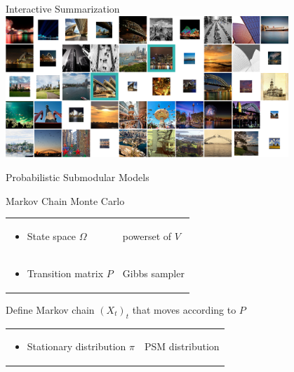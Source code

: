 \documentclass[mathserif]{beamer}
\begin{document}
\begin{frame}{Interactive Summarization}
\centering
\includegraphics[width=4.2in]{figures/flickr_probs_2_2.png}
\end{frame}

\begin{frame}{Probabilistic Submodular Models}

\end{frame}



\begin{frame}{Markov Chain Monte Carlo}
\begin{tabular}{*{2}{@{}l}}
\begin{minipage}{0.45\textwidth}
\begin{itemize}
\item State space $\Omega$
\end{itemize}
\end{minipage} & \color{col1}powerset of $V$\\[1em]
\begin{minipage}{0.45\textwidth}
\begin{itemize}
\item Transition matrix $P$
\end{itemize}
\end{minipage} & \color{col1}Gibbs sampler
\end{tabular}

\vspace{3em}
Define Markov chain $\left(X_t\right)_t$ that moves according to $P$

\vspace{2em}
\begin{tabular}{*{2}{@{}l}}
\begin{minipage}{0.45\textwidth}
\begin{itemize}
\item Stationary distribution $\pi$
\end{itemize}
\end{minipage} & \color{col1}PSM distribution
\end{tabular}
\end{frame}
\end{document}
